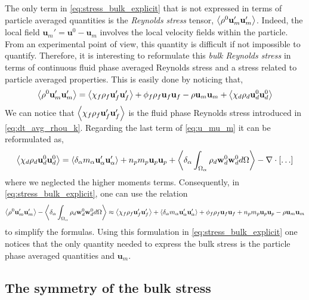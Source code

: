 The only term in \ref{eq:stress_bulk_explicit} that is not expressed in terms of particle averaged quantities is the \textit{Reynolds stress} tensor, $\left<\rho^0 \textbf{u}'_m\textbf{u}'_m\right>$. 
Indeed, the local field $\textbf{u}_m' = \textbf{u}^0 - \textbf{u}_m$ involves the local velocity fields within the particle.
From an experimental point of view, this quantity is difficult if not impossible to quantify.  
Therefore, it is interesting to reformulate this \textit{bulk Reynolds stress} in terms of continuous fluid phase averaged Reynolds stress and a stress related to particle averaged properties. 
This is easily done by noticing that, 
\begin{equation*}
    \avg{\rho^0 \textbf{u}'_m\textbf{u}'_m}
    = 
    \avg{\chi_f \rho_f \textbf{u}_f'\textbf{u}_f'}
    + \phi_f \rho_f \textbf{u}_f\textbf{u}_f
    - \rho \textbf{u}_m\textbf{u}_m
    + \avg{\chi_d \rho_d \textbf{u}_d^0\textbf{u}_d^0}
    \label{eq:u_mu_m}
\end{equation*}
We can notice that $\left<\chi_f \rho_f \textbf{u}_f'\textbf{u}_f'\right>$ is the fluid phase Reynolds stress introduced in \ref{eq:dt_avg_rhou_k}. 
Regarding the last term of \ref{eq:u_mu_m} it can be reformulated as, 
\begin{equation*}
    \left<\chi_d \rho_d \textbf{u}_d^0\textbf{u}_d^0\right>
    = 
    \left<\delta_\alpha  m_\alpha \textbf{u}_\alpha' \textbf{u}_\alpha' \right>
    + n_p m_p \textbf{u}_p\textbf{u}_p
    + \left<\delta_\alpha \int_{\Omega_{\alpha}} \rho_d \textbf{w}_d^0 \textbf{w}_d^0 d\Omega\right>
    - \mathbf{\nabla}\cdot [\ldots]
\end{equation*}
where we neglected the higher moments terms. 
Consequently, in \ref{eq:stress_bulk_explicit}, one can use the relation 
\begin{equation*}
    \left<\rho^0 \textbf{u}'_m\textbf{u}'_m\right>
    - \left<\delta_\alpha \int_{\Omega_{\alpha}} \rho_d \textbf{w}_d^0 \textbf{w}_d^0 d\Omega\right>
    \approx 
    \left<\chi_f \rho_f \textbf{u}_f'\textbf{u}_f'\right>
    + \left<\delta_\alpha  m_\alpha \textbf{u}_\alpha'\textbf{u}_\alpha'\right>
    + \phi_f \rho_f \textbf{u}_f\textbf{u}_f
    + n_p m_p \textbf{u}_p\textbf{u}_p
    - \rho \textbf{u}_m\textbf{u}_m
\end{equation*}
to simplify the formulas. 
Using this formulation in \ref{eq:stress_bulk_explicit} one notices that the only quantity needed to express the bulk stress is the particle phase averaged quantities and $\textbf{u}_m$. 

\subsection{The symmetry of the bulk stress}

